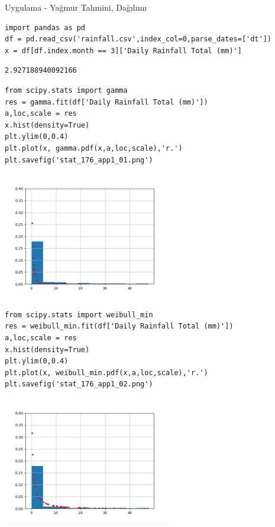 \documentclass[12pt,fleqn]{article}\usepackage{../../common}
\begin{document}
Uygulama - Yağmur Tahmini, Dağılımı


\begin{verbatim}
import pandas as pd
df = pd.read_csv('rainfall.csv',index_col=0,parse_dates=['dt'])
x = df[df.index.month == 3]['Daily Rainfall Total (mm)']
\end{verbatim}

\begin{verbatim}
2.927188940092166
\end{verbatim}


\begin{verbatim}
from scipy.stats import gamma
res = gamma.fit(df['Daily Rainfall Total (mm)'])
a,loc,scale = res  
x.hist(density=True)
plt.ylim(0,0.4)
plt.plot(x, gamma.pdf(x,a,loc,scale),'r.')
plt.savefig('stat_176_app1_01.png')
\end{verbatim}

\includegraphics[width=20em]{stat_176_app1_01.png}



\begin{verbatim}
from scipy.stats import weibull_min
res = weibull_min.fit(df['Daily Rainfall Total (mm)'])
a,loc,scale = res  
x.hist(density=True)
plt.ylim(0,0.4)
plt.plot(x, weibull_min.pdf(x,a,loc,scale),'r.')
plt.savefig('stat_176_app1_02.png')
\end{verbatim}

\includegraphics[width=20em]{stat_176_app1_02.png}
\end{document}
